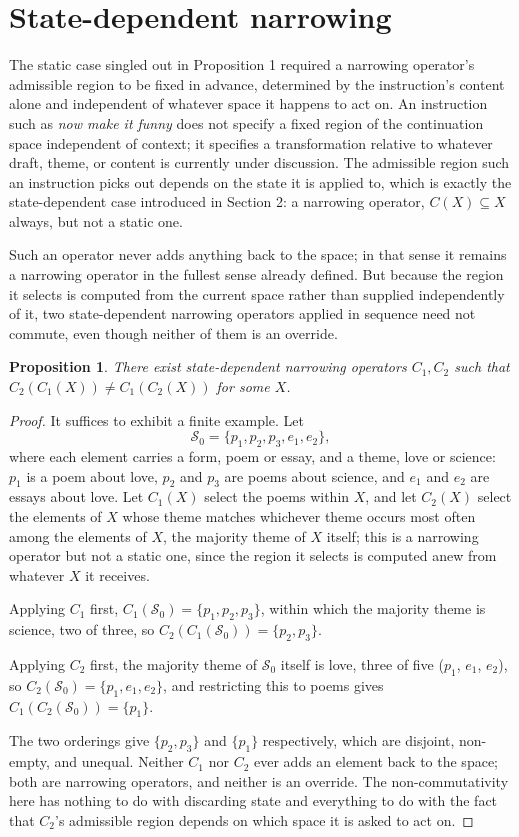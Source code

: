 \documentclass[11pt]{article}
\newtheorem{proposition}{Proposition}
\begin{document}
\section{State-dependent narrowing}

The static case singled out in Proposition 1 required a narrowing operator's admissible region to be fixed in advance, determined by the instruction's content alone and independent of whatever space it happens to act on. An instruction such as \emph{now make it funny} does not specify a fixed region of the continuation space independent of context; it specifies a transformation relative to whatever draft, theme, or content is currently under discussion. The admissible region such an instruction picks out depends on the state it is applied to, which is exactly the state-dependent case introduced in Section 2: a narrowing operator, $C(X) \subseteq X$ always, but not a static one.

Such an operator never adds anything back to the space; in that sense it remains a narrowing operator in the fullest sense already defined. But because the region it selects is computed from the current space rather than supplied independently of it, two state-dependent narrowing operators applied in sequence need not commute, even though neither of them is an override.

\begin{proposition}
There exist state-dependent narrowing operators $C_1, C_2$ such that $C_2(C_1(X)) \neq C_1(C_2(X))$ for some $X$.
\end{proposition}

\begin{proof}
It suffices to exhibit a finite example. Let
\[
\mathcal{S}_0 = \{p_1, p_2, p_3, e_1, e_2\},
\]
where each element carries a form, poem or essay, and a theme, love or science: $p_1$ is a poem about love, $p_2$ and $p_3$ are poems about science, and $e_1$ and $e_2$ are essays about love. Let $C_1(X)$ select the poems within $X$, and let $C_2(X)$ select the elements of $X$ whose theme matches whichever theme occurs most often among the elements of $X$, the majority theme of $X$ itself; this is a narrowing operator but not a static one, since the region it selects is computed anew from whatever $X$ it receives.

Applying $C_1$ first, $C_1(\mathcal{S}_0) = \{p_1, p_2, p_3\}$, within which the majority theme is science, two of three, so $C_2(C_1(\mathcal{S}_0)) = \{p_2, p_3\}$.

Applying $C_2$ first, the majority theme of $\mathcal{S}_0$ itself is love, three of five ($p_1$, $e_1$, $e_2$), so $C_2(\mathcal{S}_0) = \{p_1, e_1, e_2\}$, and restricting this to poems gives $C_1(C_2(\mathcal{S}_0)) = \{p_1\}$.

The two orderings give $\{p_2, p_3\}$ and $\{p_1\}$ respectively, which are disjoint, non-empty, and unequal. Neither $C_1$ nor $C_2$ ever adds an element back to the space; both are narrowing operators, and neither is an override. The non-commutativity here has nothing to do with discarding state and everything to do with the fact that $C_2$'s admissible region depends on which space it is asked to act on.
\end{proof}
\end{document}
